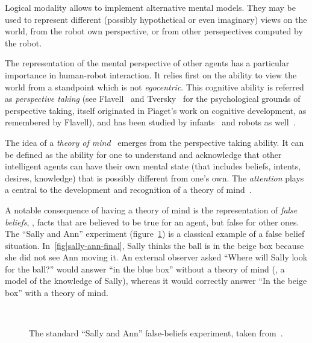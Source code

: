 Logical modality allows to implement alternative mental models. They may be
used to represent different (possibly hypothetical or even imaginary) views on
the world, from the robot own perspective, or from other persepectives computed
by the robot.

The representation of the mental perspective of other agents has a particular
importance in human-robot interaction. It relies first on the ability to view
the world from a standpoint which is not \emph{egocentric}. This cognitive
ability is referred as \emph{perspective taking} (see
Flavell~\cite{Flavell1992} and Tversky~\cite{Tversky1999} for the psychological
grounds of perspective taking, itself originated in Piaget's work on cognitive
development, as remembered by Flavell), and has been studied by
infants~\cite{Moll2006} and robots as well~\cite{Trafton2005, Breazeal2006,
Ros2010}.

The idea of a \emph{theory of mind}~\cite{Premack1978} emerges from the
perspective taking ability. It can be defined as the ability for one to
understand and acknowledge that other intelligent agents can have their own
mental state (that includes beliefs, intents, desires, knowledge) that is
possibly different from one's own. The \emph{attention} plays a central to the
development and recognition of a theory of mind~\cite{Baron-Cohen1985,
Leslie2000}.

A notable consequence of having a theory of mind is the representation of
\emph{false beliefs}, \ie, facts that are believed to be true for an agent, but
false for other ones. The ``Sally and Ann'' experiment
(figure~\ref{fig|sally-ann}) is a classical example of a false belief
situation. In~\ref{fig|sally-ann-final}, Sally thinks the ball is in the beige
box because she did not see Ann moving it. An external observer asked ``Where
will Sally look for the ball?'' would answer ``in the blue box'' without a
theory of mind (\ie, a model of the knowledge of Sally), whereas it would
correctly answer ``In the beige box'' with a theory of mind.

\begin{figure}
        \centering
         \hspace{15pt} %
         \\
         \hspace{15pt} %
        \caption{The standard ``Sally and Ann'' false-beliefs experiment, taken
        from~\cite{Leslie2000}.}

        \label{fig|sally-ann}
\end{figure}

